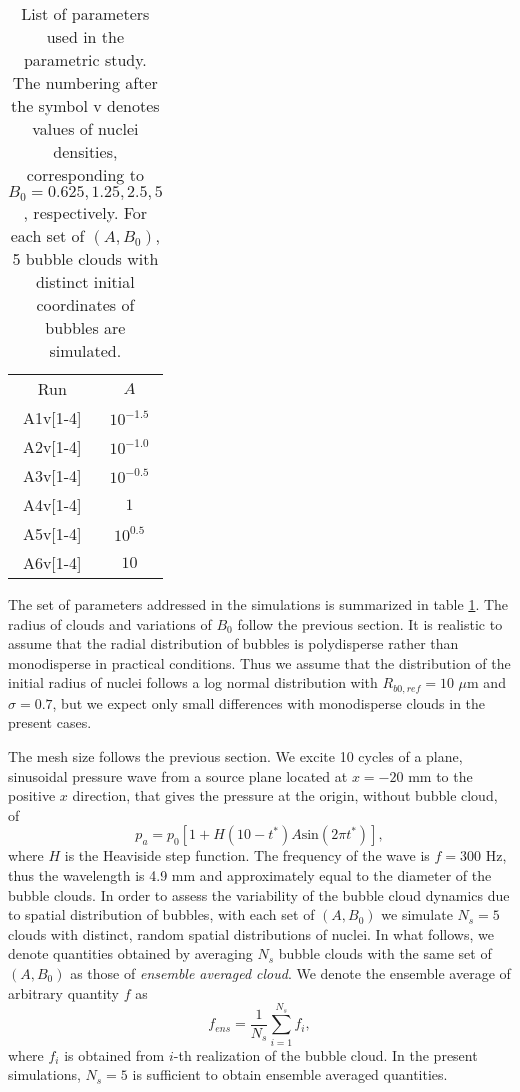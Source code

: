 \documentclass{jfm}
\begin{document}
\begin{table}
 \begin{center}
  \begin{tabular}{cc}
    Run  & $A$ \\[3pt]
       A1v[1-4] & $10^{-1.5}$\\
       A2v[1-4] & $10^{-1.0}$\\
       A3v[1-4] & $10^{-0.5}$\\
       A4v[1-4] & $1$        \\
       A5v[1-4] & $10^{0.5}$ \\
       A6v[1-4] & $10$       \\
\end{tabular}
\caption{List of parameters used in the parametric study. The numbering after the symbol v denotes values of nuclei densities, corresponding to $B_0=0.625, 1.25, 2.5, 5$, respectively. For each set of $(A,B_0)$, 5 bubble clouds with distinct initial coordinates of bubbles are simulated.}{\label{tab:kd}}
 \end{center}
\end{table}
The set of parameters addressed in the simulations is summarized in table \ref{tab:kd}.
The radius of clouds and variations of $B_0$ follow the previous section.
It is realistic to assume that the radial distribution of bubbles is polydisperse rather than monodisperse in practical conditions.
Thus we assume that the distribution of the initial radius of nuclei follows a log normal distribution with ${R}_{b0,ref}=10$ $\mu$m and $\sigma=0.7$, but we expect only small differences with monodisperse clouds in the present cases.

The mesh size follows the previous section.
We excite 10 cycles of a plane, sinusoidal pressure wave from a source plane located at $x=-20$ mm to the positive $x$ direction, that gives the pressure at the origin, without bubble cloud, of
\begin{equation}
p_a=p_0[1+H(10-t^*)A\mathrm{sin}(2\pi t^*)],
\end{equation}
where $H$ is the Heaviside step function.
The frequency of the wave is $f=300$ Hz, thus the wavelength is 4.9 mm and approximately equal to the diameter of the bubble clouds.
In order to assess the variability of the bubble cloud dynamics due to spatial distribution of bubbles, with each set of $(A,B_0)$ we simulate $N_s=5$ clouds with distinct, random spatial distributions of nuclei.
In what follows, we denote quantities obtained by averaging $N_s$ bubble clouds with the same set of $(A,B_0)$ as those of {\it{ensemble averaged cloud}}.
We denote the ensemble average of arbitrary quantity $f$ as
\begin{equation}
f_{ens}=\frac{1}{N_s}\sum_{i=1}^{N_s}f_i,
\end{equation}
where $f_i$ is obtained from $i$-th realization of the bubble cloud.
In the present simulations, $N_s=5$ is sufficient to obtain ensemble averaged quantities.
\end{document}
